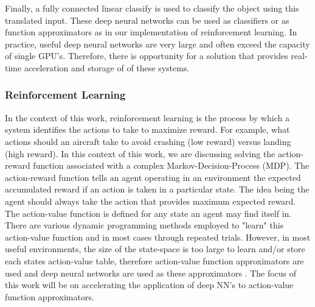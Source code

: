 Finally, a fully connected linear classify is used to classify the object using this translated input.
These deep neural networks can be used as classifiers or as function approximators as in our implementation of reinforcement learning.
In practice, useful deep neural networks are very large and often exceed the capacity of single GPU's. Therefore,  there is opportunity for a solution that provides
real-time acceleration and storage of of these systems.


\subsubsection*{Reinforcement Learning}
In the context of this work, reinforcement learning is the process by which a system identifies the actions to take to maximize reward.
For example, what actions should an aircraft take to avoid crashing (low reward) versus landing (high reward).
In this context of this work, we are discussing solving the action-reward function associated with a complex Markov-Decision-Process (MDP).
The action-reward function tells an agent operating in an environment the expected accumulated reward if an action is taken
in a particular state. The idea being the agent should always take the action that provides maximum expected reward.
The action-value function is defined for any state an agent may find itself in.
There are various dynamic programming methods employed to "learn" this action-value function and in most cases through repeated trials.
However, in most useful environments, the size of the state-space is too large to learn and/or store each states action-value table, therefore action-value function
approximators are used and deep neural networks are used as these approximators \cite{mnih2013playing}.
The focus of this work will be on accelerating the application of deep NN’s to action-value function approximators.

\fi


